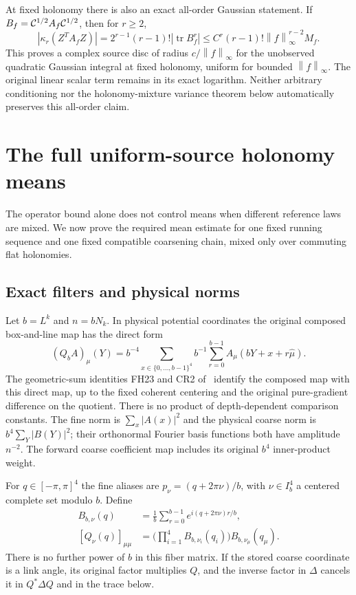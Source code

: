 \documentclass[11pt,letterpaper]{article}
\theoremstyle{remark}\newtheorem{remark}[theorem]{Remark}
\newcommand{\tr}{\operatorname{tr}}\newcommand{\Tr}{\operatorname{Tr}}
\newcommand{\norm}[1]{\left\lVert#1\right\rVert}
\begin{document}
At fixed holonomy there is also an exact all-order Gaussian statement. If
\(B_f=\mathcal C^{1/2}A_f\mathcal C^{1/2}\), then for \(r\ge2\),
\begin{equation}\label{eq:gausscumulants}
 |\kappa_r(Z^TA_fZ)|
 =2^{r-1}(r-1)!|\tr B_f^r|
 \le C^r(r-1)!\norm f_\infty^{r-2}M_f.
\end{equation}
This proves a complex source disc of radius \(c/\norm f_\infty\) for the unobserved quadratic Gaussian integral at fixed holonomy, uniform for bounded \(\norm f_\infty\). The original linear scalar term remains in its exact logarithm. Neither arbitrary conditioning nor the holonomy-mixture variance theorem below automatically preserves this all-order claim.

\section{The full uniform-source holonomy means}\label{sec:aliases}

The operator bound alone does not control means when different reference laws are mixed. We now prove the required mean estimate for one fixed running sequence and one fixed compatible coarsening chain, mixed only over commuting flat holonomies.

\subsection{Exact filters and physical norms}

Let \(b=L^k\) and \(n=bN_k\). In physical potential coordinates the original composed box-and-line map has the direct form
\begin{equation}\label{eq:Qdirect}
 (Q_bA)_\mu(Y)=b^{-4}\sum_{x\in\{0,\ldots,b-1\}^4}
 b^{-1}\sum_{r=0}^{b-1}A_\mu(bY+x+r\hat\mu).
\end{equation}
The geometric-sum identities FH23 and CR2 of~\cite[pp.~323, 383]{W} identify the composed map with this direct map, up to the fixed coherent centering and the original pure-gradient difference on the quotient. There is no product of depth-dependent comparison constants. The fine norm is \(\sum_x|A(x)|^2\) and the physical coarse norm is \(b^4\sum_Y|B(Y)|^2\); their orthonormal Fourier basis functions both have amplitude \(n^{-2}\). The forward coarse coefficient map includes its original \(b^4\) inner-product weight.

For \(q\in[-\pi,\pi]^4\) the fine aliases are
\(p_\nu=(q+2\pi\nu)/b\), with \(\nu\in I_b^4\) a centered complete set modulo \(b\). Define
\begin{align}\label{eq:filters}
 B_{b,\nu}(q)&=\frac1b\sum_{r=0}^{b-1}e^{i(q+2\pi\nu)r/b},\\
 [Q_\nu(q)]_{\mu\mu}&=
 \Big(\prod_{i=1}^4B_{b,\nu_i}(q_i)\Big)B_{b,\nu_\mu}(q_\mu).
 \nonumber
\end{align}
There is no further power of \(b\) in this fiber matrix. If the stored coarse coordinate is a link angle, its original factor multiplies \(Q\), and the inverse factor in \(\Delta\) cancels it in \(Q^*\Delta Q\) and in the trace below.
\end{document}
